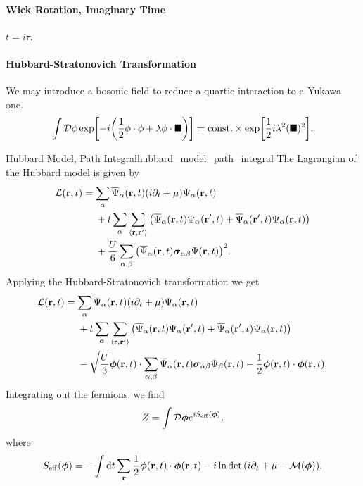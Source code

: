 \documentclass{article}
\begin{document}
\paragraph*{Wick Rotation, Imaginary Time}
$t = i\tau$.

\paragraph*{Hubbard-Stratonovich Transformation}
We may introduce a bosonic field to reduce a quartic interaction to a Yukawa one.
\[ \int \mathcal{D}\vb{\phi} \exp[-i\qty(\frac{1}{2}\vb{\phi}\cdot \vb{\phi} + \lambda \vb{\phi}\cdot \blacksquare)] = \mathrm{const.} \times \exp[\frac{1}{2}i\lambda^2 (\blacksquare)^2]. \]

\begin{example}{Hubbard Model, Path Integral}{hubbard_model_path_integral}
    The Lagrangian of the Hubbard model is given by
    \begin{align*}
        \mathcal{L}(\vb{r},t) &= \sum_\alpha \overline{\Psi}_\alpha(\vb{r},t) (i\partial_t + \mu) \Psi_\alpha(\vb{r},t) \\
        &\phantom{{}={}} + t \sum_\alpha \sum_{\langle \vb{r},\vb{r}' \rangle} \qty(\overline{\Psi}_\alpha(\vb{r},t) \Psi_\alpha(\vb{r}',t)+\overline{\Psi}_\alpha(\vb{r}',t) \Psi_\alpha(\vb{r},t)) \\
        &\phantom{{}={}} +\frac{U}{6} \sum_{\alpha,\beta} \qty(\overline{\Psi}_\alpha(\vb{r},t) \vb*{\sigma}_{\alpha\beta}\Psi(\vb{r},t))^2.
    \end{align*}
    Applying the Hubbard-Stratonovich transformation we get
    \begin{align*}
        \mathcal{L}(\vb{r},t) &= \sum_\alpha \overline{\Psi}_\alpha(\vb{r},t) (i\partial_t + \mu) \Psi_\alpha(\vb{r},t) \\
        &\phantom{{}={}} + t \sum_\alpha \sum_{\langle \vb{r},\vb{r}' \rangle} \qty(\overline{\Psi}_\alpha(\vb{r},t) \Psi_\alpha(\vb{r}',t)+\overline{\Psi}_\alpha(\vb{r}',t) \Psi_\alpha(\vb{r},t)) \\
        &\phantom{{}={}} - \sqrt{\frac{U}{3}} \vb*{\phi}(\vb{r},t) \cdot \sum_{\alpha,\beta}\overline{\Psi}_\alpha(\vb{r},t) \vb*{\sigma}_{\alpha\beta} \Psi_\beta(\vb{r},t) - \frac{1}{2}\vb*{\phi}(\vb{r},t) \cdot \vb*{\phi}(\vb{r},t).
    \end{align*}
    Integrating out the fermions, we find
    \[ Z = \int \mathcal{D}\vb*{\phi} e^{iS_{\mathrm{eff}}(\vb*{\phi})}, \]
    where
    \[ S_{\mathrm{eff}}(\vb*{\phi}) = -\int \dd{t} \sum_{\vb{r}} \frac{1}{2}\vb*{\phi}(\vb{r},t)\cdot \vb*{\phi}(\vb{r},t) - i\ln\det\qty(i\partial_t + \mu - \mathcal{M}(\vb*{\phi})), \]

\end{example}
\end{document}
